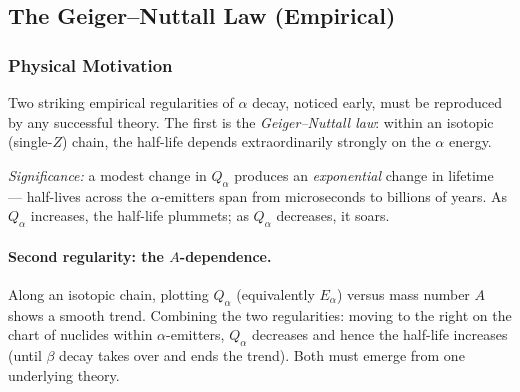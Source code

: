 
\subsection{The Geiger--Nuttall Law (Empirical)}
\label{subsec:lec08:geiger_nuttall}

\subsubsection*{Physical Motivation}
Two striking empirical regularities of $\alpha$ decay, noticed early, must be
reproduced by any successful theory.  The first is the \emph{Geiger--Nuttall
law}: within an isotopic (single-$Z$) chain, the half-life depends extraordinarily
strongly on the $\alpha$ energy.

\textit{Significance:} a modest change in $Q_\alpha$ produces an
\emph{exponential} change in lifetime --- half-lives across the $\alpha$-emitters
span from microseconds to billions of years.  As $Q_\alpha$ increases, the
half-life plummets; as $Q_\alpha$ decreases, it soars.

\paragraph{Second regularity: the $A$-dependence.}
Along an isotopic chain, plotting $Q_\alpha$ (equivalently $E_\alpha$) versus
mass number $A$ shows a smooth trend.  Combining the two regularities: moving to
the right on the chart of nuclides within $\alpha$-emitters, $Q_\alpha$ decreases
and hence the half-life increases (until $\beta$ decay takes over and ends the
trend).  Both must emerge from one underlying theory.

